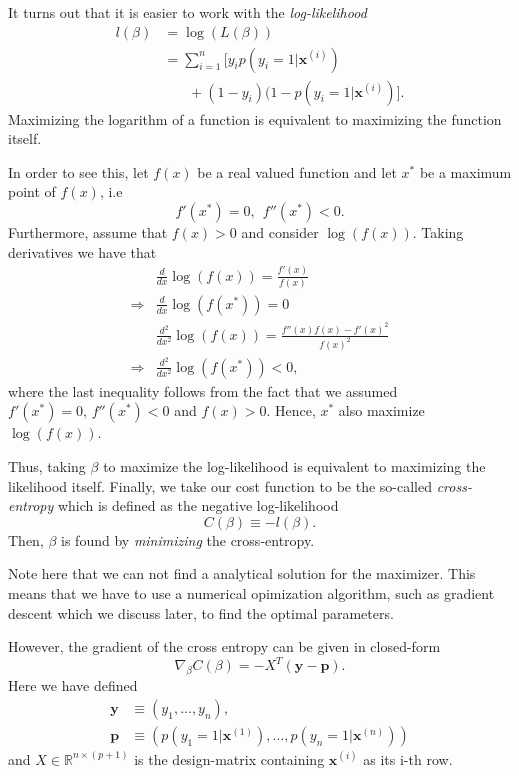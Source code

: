 \documentclass[a4paper, twocolumn]{article}
\begin{document}
It turns out that it is easier to work with the \textit{log-likelihood}
\begin{align}
 l(\beta) &= \log(L(\beta)) \nonumber \\
 &= \sum_{i=1}^n \Big[y_i p(y_i=1 | \mathbf{x}^{(i)}) \nonumber \\
 & \ \ \ \  \ \ \ \ + (1-y_i)( 1-p(y_i=1 | \mathbf{x}^{(i)})\Big]. \nonumber
\end{align}
Maximizing the logarithm of a function is equivalent to maximizing the function itself. 

In order to see this, let $f(x)$ be a
real valued function and let $x^*$ be a maximum point of $f(x)$, i.e 
\begin{equation}
 f'(x^*) = 0, \ \ f''(x^*) < 0.
\end{equation}
Furthermore, assume that $f(x) > 0$ and consider $\log(f(x))$. Taking derivatives we have that 
\begin{align}
 &\frac{d}{dx} \log (f(x)) = \frac{f'(x)}{f(x)} \\
 \Rightarrow &\frac{d}{dx} \log(f(x^*)) = 0 \\
 &\frac{d^2}{dx^2} \log(f(x)) = \frac{f''(x) f(x) - f'(x)^2}{f(x)^2} \\
 \Rightarrow &\frac{d^2}{dx^2} \log(f(x^*)) < 0, 
\end{align}
where the last inequality follows from the fact that we assumed $f'(x^*) = 0, \, f''(x^*) < 0$ and $f(x) > 0$. Hence, $x^*$
also maximize $\log(f(x))$.

Thus, taking $\beta$ to maximize the log-likelihood is equivalent to maximizing the likelihood itself. Finally, we take our 
cost function to be the so-called \textit{cross-entropy} which is defined as the negative log-likelihood 
\begin{equation}
 C(\beta) \equiv  -l(\beta).
\end{equation}
Then, $\beta$ is found by \textit{minimizing} the cross-entropy. 

Note here that we can not find a analytical solution for the maximizer. This means that we have to use a
numerical opimization algorithm, such as gradient descent which we discuss later, to find the optimal parameters.

However, the gradient of the cross entropy can be given in closed-form 
\begin{equation}
 \nabla_\beta C(\beta) = - X^{T} \left( \mathbf{y} - \mathbf{p} \right). 
\end{equation}
Here we have defined \begin{align}
\mathbf{y} &\equiv (y_1,\dots,y_n), \\       
      \mathbf{p} &\equiv \left( p(y_1=1|\mathbf{x}^{(1)}),\dots,p(y_n=1|\mathbf{x}^{(n)}) \right)
      \end{align}
and $X \in \mathbb{R}^{n \times (p+1)}$ is the design-matrix containing $\mathbf{x}^{(i)}$ as its i-th row.
\end{document}
